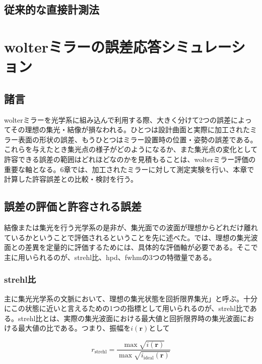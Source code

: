 \documentclass[dvipdfmx,autodetect-engine]{jreport}
\begin{document}




\section{従来的な直接計測法}

\newpage
\chapter{wolterミラーの誤差応答シミュレーション}
\minitoc

\newpage
\section{諸言}
wolterミラーを光学系に組み込んで利用する際、大きく分けて2つの誤差によってその理想の集光・結像が損なわれる。ひとつは設計曲面と実際に加工されたミラー表面の形状の誤差、もうひとつはミラー設置時の位置・姿勢の誤差である。
これらを与えたとき集光点の様子がどのようになるか、また集光点の変化として許容できる誤差の範囲はどれほどなのかを見積もることは、wolterミラー評価の重要な軸となる。6章では、加工されたミラーに対して測定実験を行い、本章で計算した許容誤差との比較・検討を行う。

\section{誤差の評価と許容される誤差}
結像または集光を行う光学系の是非が、集光面での波面が理想からどれだけ離れているかということで評価されるということを先に述べた。では、理想の集光波面との差異を定量的に評価するためには、具体的な評価軸が必要である。そこで主に用いられるのが、strehl比、hpd、fwhmの3つの特徴量である。

\subsection{strehl比}
主に集光光学系の文脈において、理想の集光状態を回折限界集光」と呼ぶ。十分にこの状態に近いと言えるための1つの指標として用いられるのが、strehl比である。strehl比とは、実際の集光波面における最大値と回折限界時の集光波面における最大値の比である。つまり、振幅を$i(\mathbf{r})$として

\[
r_{\mathrm{strehl}} = \frac{ \max{\sqrt{i(\mathbf{r})} } }{ \max{ \sqrt{i_{\mathrm{ideal}}( \mathbf{r} )} } }
\]
\end{document}
